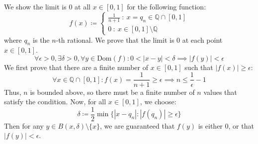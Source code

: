 \documentclass[10pt,letterpaper]{article} %
\begin{document}
\medskip
We show the limit is $0$ at all $x \in [0, 1]$ for the following function:
\begin{equation*}
f(x) \coloneq \begin{cases*}
  \frac{1}{n+1} \ : \ x = q_n \in \mathbb{Q} \cap [0, 1]\\
  0 \ : \ x \in [0, 1] \setminus \mathbb{Q}
\end{cases*}
\end{equation*}
where $q_n$ is the $n$-th rational. We prove that the limit is $0$ at each point $x \in [0, 1]$. 
\begin{equation*}
\forall \epsilon > 0, \exists \delta > 0, \forall y \in \text{Dom}(f): 0 < |x-y| < \delta \implies |f(y)| < \epsilon
\end{equation*}
We first prove that there are a finite number of $x \in [0, 1]$ such that $|f(x)| \geqslant \epsilon$:
\begin{equation*}
  \forall x \in \mathbb{Q} \cap [0, 1]: f(x) = \frac{1}{n+1} \geqslant \epsilon \implies n \leqslant \frac{1}{\epsilon} - 1
\end{equation*}
Thus, $n$ is bounded above, so there must be a finite number of $n$ values that satisfy the condition. Now, for all $x \in [0, 1]$, we choose:
\begin{equation*}
  \delta \coloneq \frac{1}{2}\min\{|x - q_n| : |f(q_n)| \geqslant \epsilon\}
\end{equation*}
Then for any $y \in B(x, \delta)\setminus \{x\}$, we are guaranteed that $f(y)$ is either $0$, or that $|f(y)| < \epsilon$.
\end{document}
